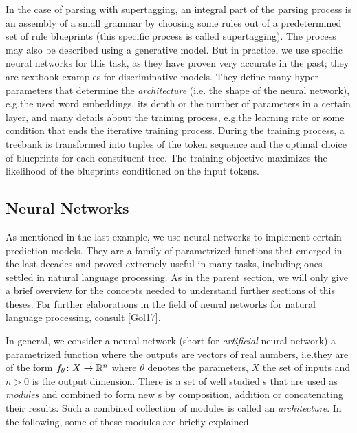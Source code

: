 \documentclass[../document.tex]{subfiles}
\begin{document}
    \begin{example}
        In the case of parsing with supertagging, an integral part of the parsing process is an assembly of a small grammar by choosing some rules out of a predetermined set of rule blueprints (this specific process is called supertagging).
        The process may also be described using a generative model.
        But in practice, we use specific neural networks for this task, as they have proven very accurate in the past; they are textbook examples for discriminative models.
        They define many hyper parameters that determine the \emph{architecture} (i.e. the shape of the neural network), e.g.\@ the used word embeddings, its depth or the number of parameters in a certain layer, and many details about the training process, e.g.\@ the learning rate or some condition that ends the iterative training process.
        During the training process, a treebank is transformed into tuples of the token sequence and the optimal choice of blueprints for each constituent tree.
        The training objective maximizes the likelihood of the blueprints conditioned on the input tokens.
    \end{example}

    \subsection{Neural Networks}
    As mentioned in the last example, we use neural networks to implement certain prediction models.
    They are a family of parametrized functions that emerged in the last decades and proved extremely useful in many tasks, including ones settled in natural language processing. 
    As in the parent section, we will only give a brief overview for the concepts needed to understand further sections of this theses.
    For further elaborations in the field of neural networks for natural language processing, consult \cref{Gol17}.

    In general, we consider a neural network (short  for \emph{artificial} neural network) a parametrized function  where the outputs are vectors of real numbers, i.e.\@ they are of the form \(f_\theta\colon X \to \mathbb{R}^n\) where \(\theta\) denotes the parameters, \(X\) the set of inputs and \(n > 0\) is the output dimension.
    There is a set of well studied s that are used as \emph{modules} and combined to form new s by composition, addition or concatenating their results.
    Such a combined collection of modules  is called an \emph{architecture}.
    In the following, some of these modules are briefly explained.
\end{document}

